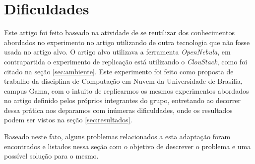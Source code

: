 \section{Dificuldades}
\label{sec:dificuldades}

Este artigo foi feito baseado na atividade de se reutilizar dos conhecimentos abordados no experimento no artigo \cite{coutinho_et_al:14} utilizando de outra tecnologia que não fosse usada no artigo alvo. O artigo alvo utilizava a ferramenta \textit{OpenNebula}, em contrapartida o experimento de replicação está utilizando o \textit{ClouStack}, como foi citado na seção \ref{sec:ambiente}. Este experimento foi feito como proposta de trabalho da disciplina de Computação em Nuvem da Universidade de Brasília, campus Gama, com o intuito de replicarmos os mesmos experimentos abordados no artigo definido pelos próprios integrantes do grupo, entretando ao decorrer dessa prática nos deparamos com inúmeras dificuldades, onde os resultados podem ser vistos na seção \ref{sec:resultados}.

Baseado neste fato, alguns problemas relacionados a esta adaptação foram encontrados e listados nessa seção com o objetivo de descrever o problema e uma possível solução para o mesmo.

